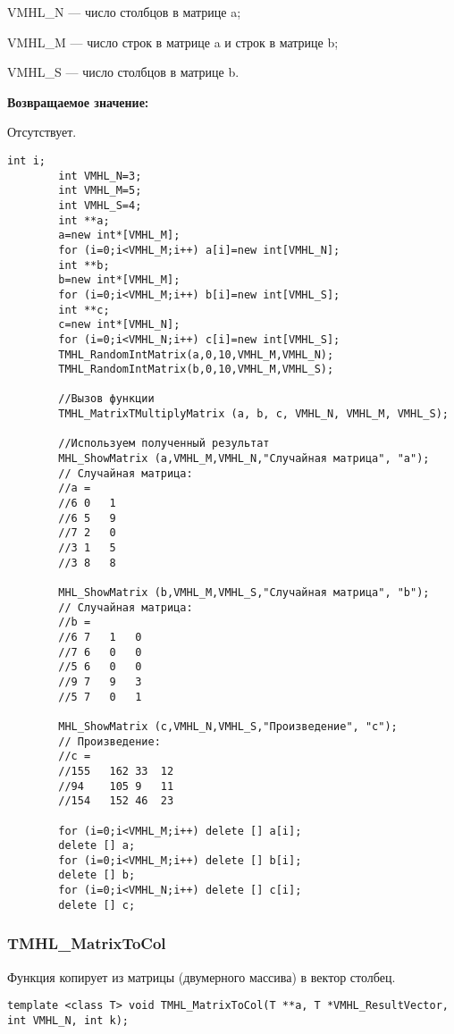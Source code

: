 \documentclass[a4paper,12pt]{article}
\begin{document}
VMHL\_N --- число столбцов в матрице a;
 
VMHL\_M --- число строк в матрице a и строк в матрице b;
 
VMHL\_S --- число столбцов в матрице b.

\textbf{Возвращаемое значение:}

Отсутствует.


\begin{lstlisting}[label=code_use_TMHL_MatrixTMultiplyMatrix,caption=Пример использования]
        int i;
        int VMHL_N=3;
        int VMHL_M=5;
        int VMHL_S=4;
        int **a;
        a=new int*[VMHL_M];
        for (i=0;i<VMHL_M;i++) a[i]=new int[VMHL_N];
        int **b;
        b=new int*[VMHL_M];
        for (i=0;i<VMHL_M;i++) b[i]=new int[VMHL_S];
        int **c;
        c=new int*[VMHL_N];
        for (i=0;i<VMHL_N;i++) c[i]=new int[VMHL_S];
        TMHL_RandomIntMatrix(a,0,10,VMHL_M,VMHL_N);
        TMHL_RandomIntMatrix(b,0,10,VMHL_M,VMHL_S);

        //Вызов функции
        TMHL_MatrixTMultiplyMatrix (a, b, c, VMHL_N, VMHL_M, VMHL_S);

        //Используем полученный результат
        MHL_ShowMatrix (a,VMHL_M,VMHL_N,"Случайная матрица", "a");
        // Случайная матрица:
        //a =
        //6	0	1
        //6	5	9
        //7	2	0
        //3	1	5
        //3	8	8

        MHL_ShowMatrix (b,VMHL_M,VMHL_S,"Случайная матрица", "b");
        // Случайная матрица:
        //b =
        //6	7	1	0
        //7	6	0	0
        //5	6	0	0
        //9	7	9	3
        //5	7	0	1

        MHL_ShowMatrix (c,VMHL_N,VMHL_S,"Произведение", "c");
        // Произведение:
        //c =
        //155	162	33	12
        //94	105	9	11
        //154	152	46	23

        for (i=0;i<VMHL_M;i++) delete [] a[i];
        delete [] a;
        for (i=0;i<VMHL_M;i++) delete [] b[i];
        delete [] b;
        for (i=0;i<VMHL_N;i++) delete [] c[i];
        delete [] c;
\end{lstlisting}

\subsubsection{TMHL\_MatrixToCol}\label{TMHL_MatrixToCol}

Функция копирует из матрицы (двумерного массива) в вектор столбец.


\begin{lstlisting}[label=code_syntax_TMHL_MatrixToCol,caption=Синтаксис]
template <class T> void TMHL_MatrixToCol(T **a, T *VMHL_ResultVector, int VMHL_N, int k);
\end{lstlisting}
\end{document}
